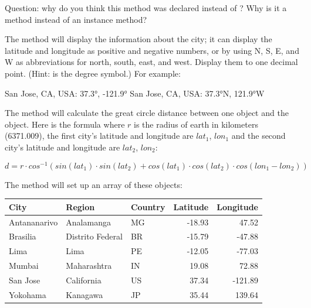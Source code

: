 \begin{exercise}
Question: why do you think this method was declared  instead of ? Why is it a  method instead of an instance method?

The  method will display the information about the city; it can display the latitude and longitude as positive and negative numbers, or by using N, S, E, and W as abbreviations for north, south, east, and west. Display them to one decimal point. (Hint:  is the degree symbol.) For example:

\begin{stdout}
San Jose, CA, USA: 37.3°, -121.9°
San Jose, CA, USA: 37.3°N, 121.9°W
\end{stdout}


The  method will calculate the great circle distance between one  object and the   object. Here is the formula where $r$ is the radius of earth in kilometers (6371.009), the first city's latitude and longitude are $lat_1$, $lon_1$ and the second city's latitude and longitude are  $lat_2$, $lon_2$:

\begin{equation*}
d = r\cdot cos^{-1}(sin(lat_1)\cdot sin(lat_2) + cos(lat_1)\cdot cos(lat_2)\cdot cos(lon_1 - lon_2))
\end{equation*}

The  method will set up an array of these  objects:

\begin{tabular}{|l|l|l|r|r|}
\hline
City & Region & Country & Latitude & Longitude \\ \hline
Antananarivo & Analamanga & MG & -18.93 & 47.52 \\ \hline
Brasilia & Distrito Federal & BR & -15.79 & -47.88 \\ \hline
Lima & Lima & PE & -12.05 & -77.03 \\ \hline
Mumbai & Maharashtra & IN & 19.08 & 72.88 \\ \hline
San Jose & California & US & 37.34 & -121.89 \\ \hline
Yokohama & Kanagawa & JP & 35.44 & 139.64 \\ \hline

\end{tabular}


\end{exercise}
